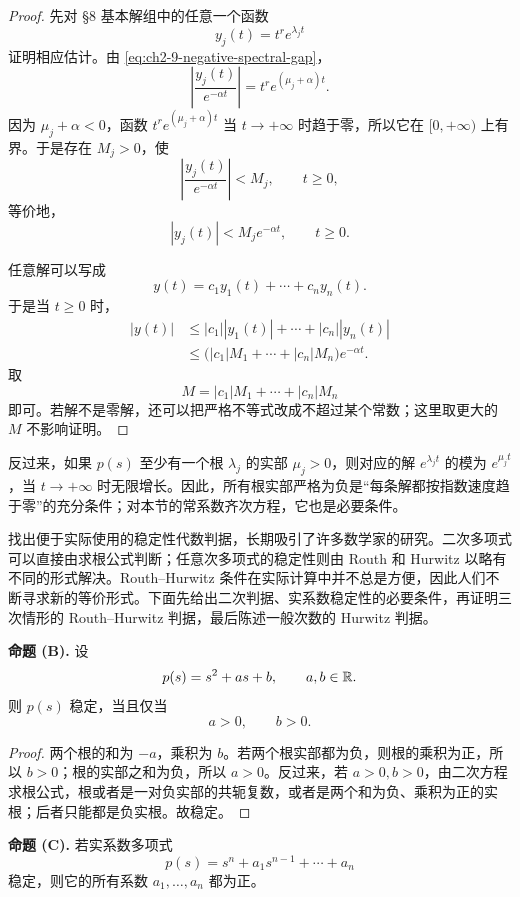 \begin{proof}
先对 §8 基本解组中的任意一个函数
\[
 y_j(t)=t^re^{\lambda_jt}
\]
证明相应估计。由 \eqref{eq:ch2-9-negative-spectral-gap}，
\[
 \left|\frac{y_j(t)}{e^{-\alpha t}}\right|
 =t^re^{(\mu_j+\alpha)t}.
\]
因为 \(\mu_j+\alpha<0\)，函数 \(t^re^{(\mu_j+\alpha)t}\) 当 \(t\to+\infty\) 时趋于零，所以它在 \([0,+\infty)\) 上有界。于是存在 \(M_j>0\)，使
\[
 \left|\frac{y_j(t)}{e^{-\alpha t}}\right|<M_j,
 \qquad t\ge0,
\]
等价地，
\begin{equation}
 |y_j(t)|<M_je^{-\alpha t},
 \qquad t\ge0.
 \label{eq:ch2-9-basis-estimate}
\end{equation}

任意解可以写成
\[
 y(t)=c_1y_1(t)+\cdots+c_ny_n(t).
\]
于是当 \(t\ge0\) 时，
\begin{align*}
 |y(t)|
 &\le |c_1||y_1(t)|+\cdots+|c_n||y_n(t)|\\
 &\le \bigl(|c_1|M_1+\cdots+|c_n|M_n\bigr)e^{-\alpha t}.
\end{align*}
取
\[
 M=|c_1|M_1+\cdots+|c_n|M_n
\]
即可。若解不是零解，还可以把严格不等式改成不超过某个常数；这里取更大的 \(M\) 不影响证明。
\end{proof}

反过来，如果 \(p(s)\) 至少有一个根 \(\lambda_j\) 的实部 \(\mu_j>0\)，则对应的解 \(e^{\lambda_jt}\) 的模为 \(e^{\mu_jt}\)，当 \(t\to+\infty\) 时无限增长。因此，所有根实部严格为负是“每条解都按指数速度趋于零”的充分条件；对本节的常系数齐次方程，它也是必要条件。

找出便于实际使用的稳定性代数判据，长期吸引了许多数学家的研究。二次多项式可以直接由求根公式判断；任意次多项式的稳定性则由 Routh 和 Hurwitz 以略有不同的形式解决。Routh--Hurwitz 条件在实际计算中并不总是方便，因此人们不断寻求新的等价形式。下面先给出二次判据、实系数稳定性的必要条件，再证明三次情形的 Routh--Hurwitz 判据，最后陈述一般次数的 Hurwitz 判据。

\medskip
\noindent\textbf{命题 (B).}
设
\[
 p(s)=s^2+as+b,
 \qquad a,b\in\mathbb R.
\]
则 \(p(s)\) 稳定，当且仅当
\[
 a>0,\qquad b>0.
\]

\begin{proof}
两个根的和为 \(-a\)，乘积为 \(b\)。若两个根实部都为负，则根的乘积为正，所以 \(b>0\)；根的实部之和为负，所以 \(a>0\)。反过来，若 \(a>0,b>0\)，由二次方程求根公式，根或者是一对负实部的共轭复数，或者是两个和为负、乘积为正的实根；后者只能都是负实根。故稳定。
\end{proof}

\medskip
\noindent\textbf{命题 (C).}
若实系数多项式
\[
 p(s)=s^n+a_1s^{n-1}+\cdots+a_n
\]
稳定，则它的所有系数 \(a_1,\ldots,a_n\) 都为正。


